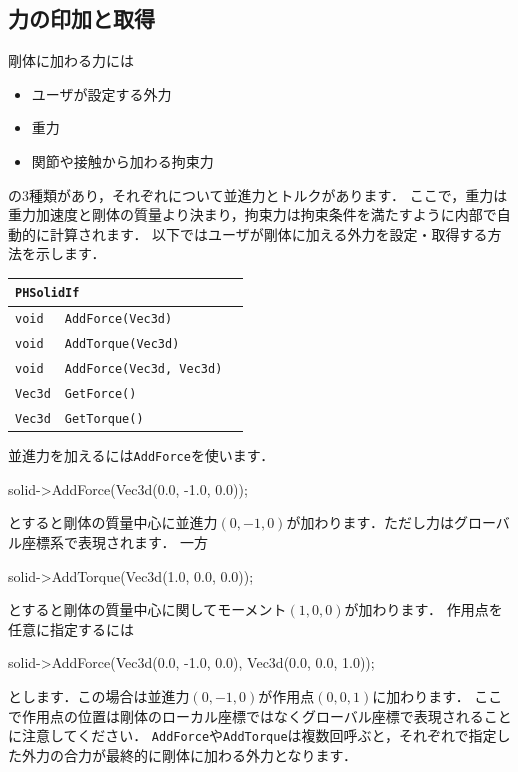 \subsection*{力の印加と取得}

\KLUDGE 剛体に加わる力には
\begin{itemize}
\item ユーザが設定する外力
\item 重力
\item 関節や接触から加わる拘束力
\end{itemize}
\KLUDGE の$3$種類があり，それぞれについて並進力とトルクがあります．
\KLUDGE ここで，重力は重力加速度と剛体の質量より決まり，拘束力は拘束条件を満たすように内部で自動的に計算されます．
\KLUDGE 以下ではユーザが剛体に加える外力を設定・取得する方法を示します．

\begin{center}
\begin{tabular}{p{.2\hsize}p{.5\hsize}p{.20\hsize}}
\multicolumn{3}{l}{\texttt{PHSolidIf}}								\\ \midrule
\texttt{void} 	& \texttt{AddForce(Vec3d)}					& \\
\texttt{void} 	& \texttt{AddTorque(Vec3d)}					& \\
\texttt{void} 	& \texttt{AddForce(Vec3d, Vec3d)}			& \\
\texttt{Vec3d} 	& \texttt{GetForce()}						& \\
\texttt{Vec3d} 	& \texttt{GetTorque()}						& \\
\end{tabular}
\end{center}

\KLUDGE 並進力を加えるには\texttt{AddForce}を使います．
\begin{sourcecode}
solid->AddForce(Vec3d(0.0, -1.0, 0.0));
\end{sourcecode}
\KLUDGE とすると剛体の質量中心に並進力$(0, -1, 0)$が加わります．ただし力はグローバル座標系で表現されます．
\KLUDGE 一方
\begin{sourcecode}
solid->AddTorque(Vec3d(1.0, 0.0, 0.0));
\end{sourcecode}
\KLUDGE とすると剛体の質量中心に関してモーメント$(1, 0, 0)$が加わります．
\KLUDGE 作用点を任意に指定するには
\begin{sourcecode}
solid->AddForce(Vec3d(0.0, -1.0, 0.0), Vec3d(0.0, 0.0, 1.0));
\end{sourcecode}
\KLUDGE とします．この場合は並進力$(0, -1, 0)$が作用点$(0, 0, 1)$に加わります．
\KLUDGE ここで作用点の位置は剛体のローカル座標ではなくグローバル座標で表現されることに注意してください．
\texttt{AddForce}や\texttt{AddTorque}は複数回呼ぶと，それぞれで指定した外力の合力が最終的に剛体に加わる外力となります．

